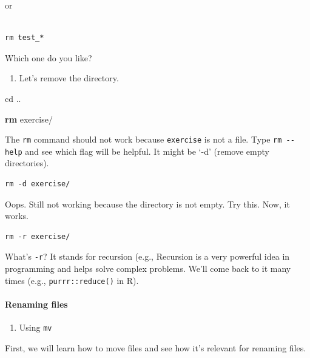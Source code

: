 \documentclass[
]{book}
\newenvironment{Shaded}{\begin{snugshade}}{\end{snugshade}}
\newcommand{\BuiltInTok}[1]{#1}
\newcommand{\FunctionTok}[1]{\textcolor[rgb]{0.13,0.29,0.53}{\textbf{#1}}}
\newcommand{\NormalTok}[1]{#1}
\providecommand{\tightlist}{%
  \setlength{\itemsep}{0pt}\setlength{\parskip}{0pt}}
\begin{document}
or

\begin{verbatim}

rm test_*
\end{verbatim}

Which one do you like?

\begin{enumerate}
\def\labelenumi{\arabic{enumi}.}
\setcounter{enumi}{3}
\tightlist
\item
  Let's remove the directory.
\end{enumerate}

\begin{Shaded}
\begin{Highlighting}[]
\BuiltInTok{cd}\NormalTok{ ..}

\FunctionTok{rm}\NormalTok{ exercise/}
\end{Highlighting}
\end{Shaded}

The \texttt{rm} command should not work because \texttt{exercise} is not a file. Type \texttt{rm\ -\/-help} and see which flag will be helpful. It might be `-d' (remove empty directories).

\begin{verbatim}
rm -d exercise/
\end{verbatim}

Oops. Still not working because the directory is not empty. Try this. Now, it works.

\begin{verbatim}
rm -r exercise/
\end{verbatim}

What's \texttt{-r}? It stands for recursion (e.g., Recursion is a very powerful idea in programming and helps solve complex problems. We'll come back to it many times (e.g., \texttt{purrr::reduce()} in R).

\paragraph{Renaming files}\label{renaming-files}

\begin{enumerate}
\def\labelenumi{\arabic{enumi}.}
\tightlist
\item
  Using \texttt{mv}
\end{enumerate}

First, we will learn how to move files and see how it's relevant for renaming files.
\end{document}
